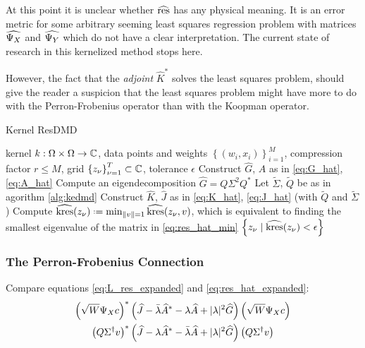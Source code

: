 At this point it is unclear whether $\widehat{ \text{res} }$ has any physical meaning. It is 
an error metric for some arbitrary seeming least squares regression problem with matrices 
$\widehat{ \Psi_X }$ and $\widehat{ \Psi_Y }$ which do not have a clear interpretation. The 
current state of research in this kernelized method stops here. 

However, 
the fact that the \emph{adjoint} $\widehat{ K }^*$ solves the least squares problem, 
should give the reader a suspicion that the least squares problem might have more to do 
with the Perron-Frobenius operator than with the Koopman operator. 

\begin{algorithm}
    \caption{Kernel ResDMD}
    \label{alg:kresdmd}
    \begin{algorithmic}[1]
        \Require kernel $k : \Omega \times \Omega \to \mathbb{C}$, data points and weights 
            $\left\{ (w_i, x_i) \right\}_{i=1}^M$, compression factor $r \leq M$,
            grid $\left\{ z_\nu \right\}_{\nu=1}^T \subset \mathbb{C}$,
            tolerance $\epsilon$
        \State Construct $\widehat{G}$, $\widehat{A}$ as in \ref{eq:G_hat}, \ref{eq:A_hat}
        \State Compute an eigendecomposition $\widehat{G} = Q \Sigma^2 Q^*$
        \State Let $\widetilde{\Sigma}$, $\widetilde{Q}$ be as in agorithm \ref{alg:kedmd}
        \State Construct $\widehat{ K }$, $\widehat{ J }$ as in \ref{eq:K_hat}, 
            \ref{eq:J_hat} (with $\widetilde{ Q }$ and $\widetilde{ \Sigma }$)
        \State Compute $\widehat{ \kres } (z_\nu) 
            \defeq \min_{\| v \| = 1} \widehat{ \kres } (z_\nu, v)$, which is equivalent 
            to finding the smallest eigenvalue of the matrix in \ref{eq:res_hat_min}
        \EndFor
        \State \Return $\left\{ z_\nu \mid \widehat{\text{kres}} (z_\nu) < \epsilon \right\}$
    \end{algorithmic}
\end{algorithm}


\subsubsection{The Perron-Frobenius Connection}

Compare equations 
\ref{eq:L_res_expanded} and \ref{eq:res_hat_expanded}: 
\begin{align}
    \left( \sqrt{W} \Psi_X c \right)^* &
    \left( 
        \widehat{ J } 
        - \bar{\lambda} \widehat{ A }^* 
        - \lambda \widehat{ A } 
        + | \lambda |^2 \widehat{ G } 
    \right) 
    \left( \sqrt{W} \Psi_X c \right) \\
    \left( Q \Sigma^\dagger v \right)^* &
    \left( 
        \widehat{ J } 
        - \lambda \widehat{ A }^* 
        - \bar{\lambda} \widehat{ A } 
        + | \lambda |^2 \widehat{ G } 
    \right) 
    \left( Q \Sigma^\dagger v \right)
\end{align}


